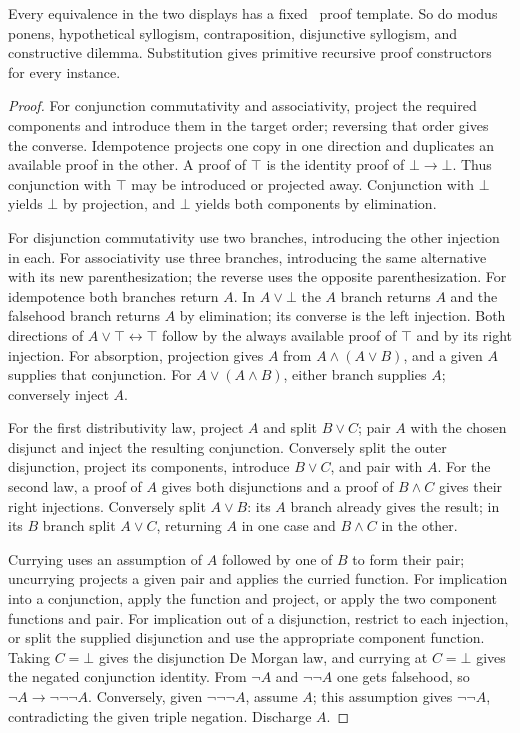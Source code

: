 \begin{theorem}\label{thm:int-laws}
Every equivalence in the two displays has a fixed \IPC\ proof template.
So do modus ponens, hypothetical syllogism, contraposition, disjunctive
syllogism, and constructive dilemma. Substitution gives primitive
recursive proof constructors for every instance.
\end{theorem}
\begin{proof}
For conjunction commutativity and associativity, project the required
components and introduce them in the target order; reversing that order
gives the converse. Idempotence projects one copy in one direction and
duplicates an available proof in the other. A proof of $\top$ is the
identity proof of $\bot\to\bot$. Thus conjunction with $\top$ may be
introduced or projected away. Conjunction with $\bot$ yields $\bot$ by
projection, and $\bot$ yields both components by elimination.

For disjunction commutativity use two branches, introducing the other
injection in each. For associativity use three branches, introducing the
same alternative with its new parenthesization; the reverse uses the
opposite parenthesization. For idempotence both branches return $A$.
In $A\vee\bot$ the $A$ branch returns $A$ and the falsehood branch returns
$A$ by elimination; its converse is the left injection. Both directions
of $A\vee\top\leftrightarrow\top$ follow by the always available proof of
$\top$ and by its right injection. For absorption, projection gives
$A$ from $A\wedge(A\vee B)$, and a given $A$ supplies that conjunction.
For $A\vee(A\wedge B)$, either branch supplies $A$; conversely inject $A$.

For the first distributivity law, project $A$ and split $B\vee C$; pair
$A$ with the chosen disjunct and inject the resulting conjunction. Conversely
split the outer disjunction, project its components, introduce $B\vee C$,
and pair with $A$. For the second law, a proof of $A$ gives both disjunctions
and a proof of $B\wedge C$ gives their right injections. Conversely split
$A\vee B$: its $A$ branch already gives the result; in its $B$ branch split
$A\vee C$, returning $A$ in one case and $B\wedge C$ in the other.

Currying uses an assumption of $A$ followed by one of $B$ to form their
pair; uncurrying projects a given pair and applies the curried function.
For implication into a conjunction, apply the function and project, or
apply the two component functions and pair. For implication out of a
disjunction, restrict to each injection, or split the supplied disjunction
and use the appropriate component function. Taking $C=\bot$ gives the
disjunction De Morgan law, and currying at $C=\bot$ gives the negated
conjunction identity. From $\neg A$ and $\neg\neg A$ one gets falsehood,
so $\neg A\to\neg\neg\neg A$. Conversely, given $\neg\neg\neg A$, assume
$A$; this assumption gives $\neg\neg A$, contradicting the given triple
negation. Discharge $A$.


\end{proof}
